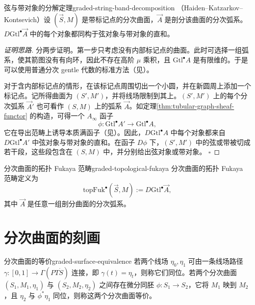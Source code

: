 \begin{theorem}{弦与带对象的分解定理}{graded-string-band-decomposition}
\textnormal{（Haiden--Katzarkov--Kontsevich）}设 $(\vec S,M)$ 是带标记点的分次曲面，$\vec A$ 是剖分该曲面的分次弧系。$D\mathrm{Gtl}^{\bullet}\vec A$ 中的每个对象都同构于弦对象与带对象的直和。
\end{theorem}
\begin{proof}[证明思路]
分两步证明。第一步只考虑没有内部标记点的曲面。此时可选择一组弧系，使其箭图没有有向环，因此不存在高阶 $\mu$ 乘积，且 $\mathrm{Gtl}^{\bullet}A$ 是有限维的。于是可以使用普通分次 gentle 代数的标准方法（见）。

对于含内部标记点的情形，在该标记点周围切出一个小圆，并在新圆周上添加一个标记点。记所得曲面为 $(S',M')$，并将线场限制到其上。$(S',M')$ 上的每个分次弧系 $\vec A'$ 也可看作 $(S,M)$ 上的弧系 $\vec A$。如定理\ref{thm:tubular-graph-sheaf-functor} 的构造，可得一个 $A_\infty$ 函子
\[
  \phi\colon\mathrm{Gtl}^{\bullet}A'\longrightarrow\mathrm{Gtl}^{\bullet}A,
\]
它在导出范畴上诱导本质满函子（见）。因此，$D\mathrm{Gtl}^{\bullet}A$ 中每个对象都来自 $D\mathrm{Gtl}^{\bullet}A'$ 中弦对象与带对象的直和。在函子 $D\phi$ 下，$(S',M')$ 中的弦或带被切成若干段，这些段包含在 $(S,M)$ 中，并分别给出弦对象或带对象。
\hfill$\square$
\end{proof}

\begin{definition}{分次曲面的拓扑 Fukaya 范畴}{graded-topological-fukaya}
分次曲面的拓扑 Fukaya 范畴定义为
\[
  \mathrm{topFuk}^{\bullet}(\vec S,M):=D\mathrm{Gtl}^{\bullet}\vec A,
\]
其中 $\vec A$ 是任意一组剖分曲面的分次弧系。
\end{definition}

\section{分次曲面的刻画}\label{sec:characterizing-graded-surfaces}
\begin{definition}{分次曲面的等价}{graded-surface-equivalence}
若两个线场 $\eta_0,\eta_1$ 可由一条线场路径 $\gamma\colon[0,1]\to\Gamma(P T\dot S)$ 连接，即 $\gamma(t)=\eta_t$，则称它们同位。若两个分次曲面 $(S_1,M_1,\eta_1)$ 与 $(S_2,M_2,\eta_2)$ 之间存在微分同胚 $\phi\colon S_1\to S_2$，它将 $M_1$ 映到 $M_2$，且 $\eta_2$ 与 $\phi^*\eta_1$ 同位，则称这两个分次曲面等价。
\end{definition}

